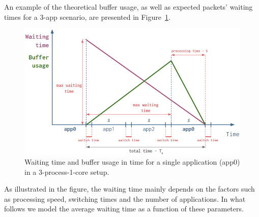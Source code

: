 \documentclass[english]{kththesis}
\begin{document}
An example of the theoretical buffer usage, as well as expected packets' waiting times for a 3-app scenario, are presented in Figure~\ref{fig:processing}.
\begin{figure}[!ht]
  \begin{center}
    \includegraphics[width=1\textwidth]{Fig10}
  \end{center}
  \caption{Waiting time and buffer usage in time for a single application (app0) in a 3-process-1-core setup.}
  \label{fig:processing}
\end{figure}
As illustrated in the figure, the waiting time mainly depends on the factors such as processing speed, switching times and the number of applications. In what follows we model the average waiting time as a function of these parameters.
\end{document}
